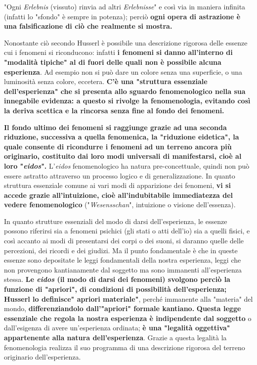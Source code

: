 "Ogni \textit{Erlebnis} (vissuto) rinvia ad altri \textit{Erlebnisse}"
e così via in maniera infinita (infatti lo "sfondo" è
sempre in potenza); perciò \textbf{ogni opera di
astrazione è una falsificazione di ciò che
realmente si mostra.}

Nonostante ciò secondo Husserl è possibile
una descrizione rigorosa delle essenze cui
i fenomeni si riconducono: infatti \textbf{i fenomeni
si danno all'interno di "modalità tipiche"
al di fuori delle quali non è possibile alcuna
esperienza}. Ad esempio non si può dare un
colore senza una superficie, o una luminosità senza colore, eccetera. \textbf{C'è una "struttura
essenziale dell'esperienza" che si presenta allo
sguardo fenomenologico nella sua innegabile
evidenza: a questo si rivolge la fenomenologia, evitando così la deriva scettica e la
rincorsa senza fine al fondo dei fenomeni.}

\textbf{Il fondo ultimo dei fenomeni si raggiunge
grazie ad una seconda riduzione, successiva a
quella fenomenica, la "riduzione eidetica",
la quale consente di ricondurre i fenomeni
ad un terreno ancora più originario,
costituito dai loro modi universali di
manifestarsi, cioè al loro "\textit{eidos}".}
L'\textit{eidos} fenomenologico ha natura pre-concettuale,
quindi non può essere astratto attraverso un processo
logico e di generalizzazione. In quanto struttura
essenziale comune ai vari modi di apparizione dei
fenomeni, \textbf{vi si accede grazie all'intuizione, cioè
all'indubitabile immediatezza del vedere
fenomenologico} ("\textit{Wesensschan}", intuizione o
visione dell'essenza).

In quanto strutture essenziali del modo di darsi
dell'esperienza, le essenze possono riferirsi
sia a fenomeni psichici (gli stati o atti dell'io)
sia a quelli fisici, e così accanto ai modi di
presentarsi dei corpi o dei suoni, si daranno quelle
delle percezioni, dei ricordi e dei giudizi.
Ma il punto fondamentale è che in queste
essenze sono depositate le leggi fondamentali
della nostra esperienza, leggi che non
provengono kantianamente dal soggetto ma sono
immanenti all'esperienza stessa. \textbf{Le \textit{eidos} (il modo di darsi dei fenomeni)
svolgono perciò la funzione di "apriori", di
condizioni di possibilità dell'esperienza;
Husserl lo definisce" apriori materiale"}, perché
immanente alla "materia" del mondo, \textbf{differenziandolo dall'"apriori" formale kantiano.}
\textbf{Questa legge essenziale che regola la nostra
esperienza è indipendente dal soggetto }o dall'esigenza di avere un'esperienza ordinata;
\textbf{è una "legalità oggettiva" appartenente alla
natura dell'esperienza}. Grazie a questa
legalità la fenomenologia realizza il suo
programma di una descrizione rigorosa
del terreno originario dell'esperienza.

